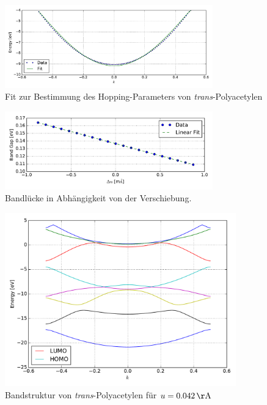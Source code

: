 \begin{frame}
\begin{figure}
	\centering
	\includegraphics[width = 9cm]{Images/polyacetylene/bands/band_fit}
	\caption{Fit zur Bestimmung des Hopping-Parameters von \emph{trans}-Polyacetylen}
	\label{image_band_fit_t0}
\end{figure}
\vspace*{-0.5cm}

\begin{figure}
	\centering
	\includegraphics[width = 9cm]{Images/polyacetylene/bands/alpha}
	\caption{Bandlücke in Abhängigkeit von der Verschiebung.}
	\label{image_alpha_fit}
\end{figure}
\end{frame}

\begin{frame}
\begin{figure}
	\centering
	\includegraphics[width = 10cm]{Images/polyacetylene/bands/bandstructure_manually_displaced}
	\caption{Bandstruktur von \emph{trans}-Polyacetylen für $u = \unit[0.042]{\AA}$}
	\label{image_manually_displaced_poly_bandstructure}
\end{figure}
\end{frame}